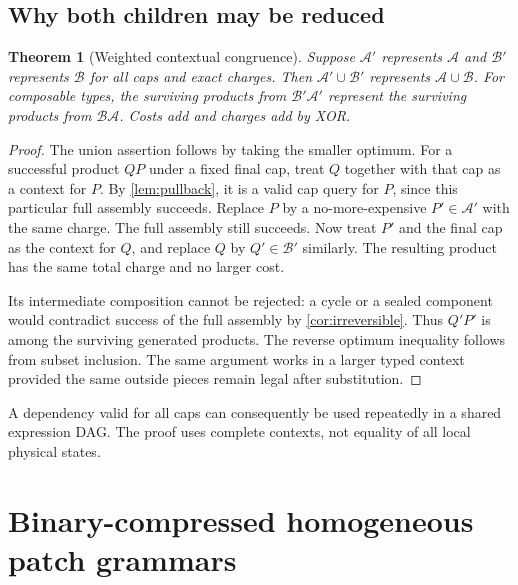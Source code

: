 \documentclass[11pt,a4paper]{article}
\newtheorem{theorem}{Theorem}[section]
\theoremstyle{definition}
\begin{document}
\subsection{Why both children may be reduced}
\begin{theorem}[Weighted contextual congruence]\label{thm:congruence}
Suppose $\mathcal A'$ represents $\mathcal A$ and $\mathcal B'$ represents $\mathcal B$ for all caps and exact charges. Then $\mathcal A'\cup\mathcal B'$ represents $\mathcal A\cup\mathcal B$. For composable types, the surviving products from $\mathcal B'\mathcal A'$ represent the surviving products from $\mathcal B\mathcal A$. Costs add and charges add by XOR.
\end{theorem}
\begin{proof}
The union assertion follows by taking the smaller optimum. For a successful product $QP$ under a fixed final cap, treat $Q$ together with that cap as a context for $P$. By \cref{lem:pullback}, it is a valid cap query for $P$, since this particular full assembly succeeds. Replace $P$ by a no-more-expensive $P'\in\mathcal A'$ with the same charge. The full assembly still succeeds. Now treat $P'$ and the final cap as the context for $Q$, and replace $Q$ by $Q'\in\mathcal B'$ similarly. The resulting product has the same total charge and no larger cost.

Its intermediate composition cannot be rejected: a cycle or a sealed component would contradict success of the full assembly by \cref{cor:irreversible}. Thus $Q'P'$ is among the surviving generated products. The reverse optimum inequality follows from subset inclusion. The same argument works in a larger typed context provided the same outside pieces remain legal after substitution.
\end{proof}

A dependency valid for all caps can consequently be used repeatedly in a shared expression DAG. The proof uses complete contexts, not equality of all local physical states.

\section{Binary-compressed homogeneous patch grammars}\label{sec:grammar}
\end{document}

